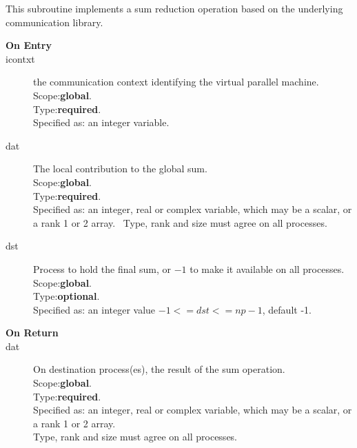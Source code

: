 This subroutine implements a sum reduction  operation based on the
underlying communication library. 
\begin{description}
\item[\bf  On Entry ]
\item[icontxt] the communication context identifying the virtual
  parallel machine.\\
Scope:{\bf global}.\\
Type:{\bf required}.\\
Specified as: an integer variable.
\item[dat] The local contribution to the global sum.\\
Scope:{\bf global}.\\
Type:{\bf required}.\\
Specified as: an integer, real or complex variable, which may be a
scalar, or a rank 1 or 2 array. \
Type, rank and size must agree on all processes.
\item[dst] Process to hold the final sum, or $-1$ to make it available
  on all processes.\\
Scope:{\bf global}.\\
Type:{\bf optional}.\\
Specified as: an integer value $-1<= dst <= np-1$, default -1. \
\end{description}


\begin{description}
\item[\bf On Return]
\item[dat] On destination process(es), the result of the sum operation.\\
Scope:{\bf global}.\\
Type:{\bf required}.\\
Specified as: an integer, real or complex variable, which may be a
scalar, or a rank 1 or 2 array. \\
Type, rank and size must agree on all processes.
\end{description}



